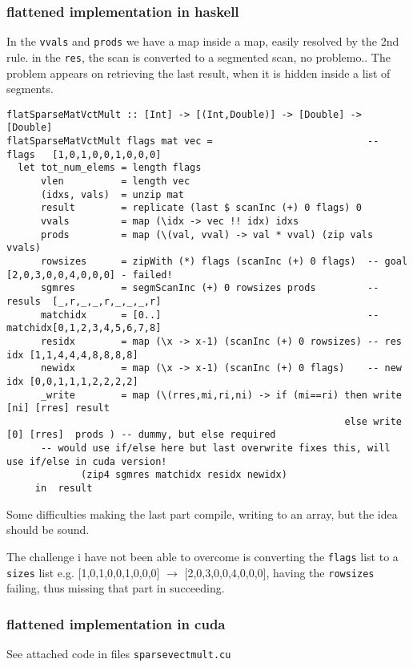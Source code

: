 \documentclass[a4paper,10pt]{article}
\begin{document}
\subsubsection{flattened implementation in haskell}
In the \texttt{vvals} and \texttt{prods} we have a map inside a map, easily resolved by the 2nd rule.
in the \texttt{res}, the scan is converted to a segmented scan, no problemo..
The problem appears on retrieving the last result, when it is hidden inside a list of segments.
\begin{verbatim}
flatSparseMatVctMult :: [Int] -> [(Int,Double)] -> [Double] -> [Double]
flatSparseMatVctMult flags mat vec =                           -- flags   [1,0,1,0,0,1,0,0,0]
  let tot_num_elems = length flags
      vlen          = length vec
      (idxs, vals)  = unzip mat
      result        = replicate (last $ scanInc (+) 0 flags) 0
      vvals         = map (\idx -> vec !! idx) idxs
      prods         = map (\(val, vval) -> val * vval) (zip vals vvals)
      rowsizes      = zipWith (*) flags (scanInc (+) 0 flags)  -- goal    [2,0,3,0,0,4,0,0,0] - failed!
      sgmres        = segmScanInc (+) 0 rowsizes prods         -- resuls  [_,r,_,_,r,_,_,_,r]
      matchidx      = [0..]                                    -- matchidx[0,1,2,3,4,5,6,7,8]
      residx        = map (\x -> x-1) (scanInc (+) 0 rowsizes) -- res idx [1,1,4,4,4,8,8,8,8]
      newidx        = map (\x -> x-1) (scanInc (+) 0 flags)    -- new idx [0,0,1,1,1,2,2,2,2]
      _write        = map (\(rres,mi,ri,ni) -> if (mi==ri) then write [ni] [rres] result
                                                           else write  [0] [rres]  prods ) -- dummy, but else required
      -- would use if/else here but last overwrite fixes this, will use if/else in cuda version!
             (zip4 sgmres matchidx residx newidx)
     in  result
\end{verbatim}
Some difficulties making the last part compile, writing to an array, but the idea should be sound.

The challenge i have not been able to overcome is converting the \texttt{flags} list to a \texttt{sizes} list e.g. [1,0,1,0,0,1,0,0,0] $\rightarrow$ [2,0,3,0,0,4,0,0,0], having the \texttt{rowsizes} failing, thus missing that part in succeeding.

\subsubsection{flattened implementation in cuda}
See attached code in files \texttt{sparsevectmult.cu}
\end{document}
